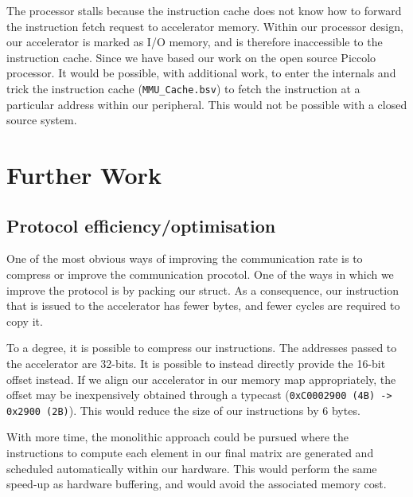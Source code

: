\documentclass[a4paper,8pt]{report}
\begin{document}
The processor stalls because the instruction cache does not know how to forward
the instruction fetch request to accelerator memory. Within our processor
design, our accelerator is marked as I/O memory, and is therefore inaccessible
to the instruction cache. Since we have based our work on the open source
Piccolo processor. It would be possible, with additional work, to enter the
internals and trick the instruction cache (\texttt{MMU\_Cache.bsv}) to fetch the
instruction at a particular address within our peripheral. This would not be
possible with a closed source system.

\section{Further Work}
\subsection{Protocol efficiency/optimisation}
One of the most obvious ways of improving the communication rate is to compress
or improve the communication procotol. One of the ways in which we improve the
protocol is by packing our struct. As a consequence, our instruction that is
issued to the accelerator has fewer bytes, and fewer cycles are required to copy it.

To a degree, it is possible to compress our instructions. The addresses passed
to the accelerator are 32-bits. It is possible to instead directly provide the
16-bit offset instead. If we align our accelerator in our memory map
appropriately, the offset may be inexpensively obtained through a typecast
(\texttt{0xC0002900 (4B) -> 0x2900 (2B)}). This would reduce the size of our
instructions by 6 bytes.

With more time, the monolithic approach could be pursued where the
instructions to compute each element in our final matrix are generated and
scheduled automatically within our hardware. This would perform the same
speed-up as hardware buffering, and would avoid the associated memory cost.

\end{document}
